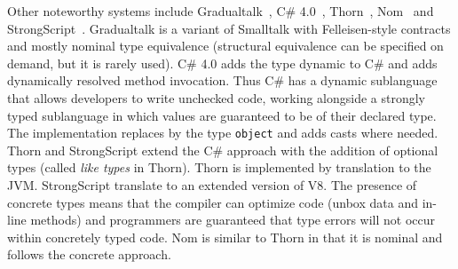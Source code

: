 \documentclass[USenglish]{tex/lipics-v2016}f
\begin{document}
Other noteworthy systems include Gradualtalk~\cite{GS13}, C\#
4.0~\cite{Bierman10}, Thorn~\cite{oopsla09}, Nom~\cite{Muehlboeck2017} and
Strong\-Script~\cite{ecoop15}. Gradualtalk is a variant of Smalltalk with
Felleisen-style contracts and mostly nominal type equivalence (structural
equivalence can be specified on demand, but it is rarely
used). C\# 4.0 adds the type {\sf dynamic} to C\# and adds dynamically resolved
method invocation. Thus C\# has a dynamic sublanguage that allows developers
to write unchecked code, working alongside a strongly typed sublanguage in
which values are guaranteed to be of their declared type.  The
implementation replaces \any by the type {\tt object} and adds casts where
needed.  Thorn and StrongScript extend the C\# approach with the addition of
optional types (called {\em like types} in Thorn).  Thorn is implemented by
translation to the JVM. StrongScript translate to an extended version of
V8. The presence of concrete types means that the compiler can optimize code
(unbox data and in-line methods) and programmers are guaranteed that type
errors will not occur within concretely typed code. Nom is similar to Thorn
in that it is nominal and follows the concrete approach.

\newcommand{\rot}[1]{\rotatebox{80}{#1}\hspace{-10px}}
\newcommand{\X}{\EM{\bullet}}
\newcommand{\XX}{\EM{\bullet^{2}}}
\newcommand{\XY}{\EM{\bullet^{1}}}
\end{document}
